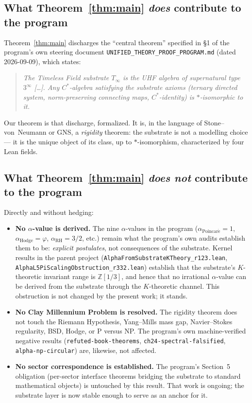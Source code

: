 \documentclass[11pt,a4paper]{article}
\theoremstyle{plain}
\theoremstyle{definition}
\begin{document}
\subsection*{What Theorem~\ref{thm:main} \emph{does} contribute to the program}

Theorem~\ref{thm:main} discharges the ``central theorem'' specified in \S 1 of the program's own steering document \texttt{UNIFIED\_THEORY\_PROOF\_PROGRAM.md} (dated 2026-09-09), which states:

\begin{quote}\itshape
The Timeless Field substrate $T_{\infty}$ is the UHF algebra of supernatural type $3^{\infty}$ [\ldots]. Any $C^{\ast}$-algebra satisfying the substrate axioms (ternary directed system, norm-preserving connecting maps, $C^{\ast}$-identity) is $\ast$-isomorphic to it.
\end{quote}

Our theorem is that discharge, formalized. It is, in the language of Stone--von~Neumann or GNS, a \emph{rigidity} theorem: the substrate is not a modelling choice --- it is the unique object of its class, up to $\ast$-isomorphism, characterized by four Lean fields.

\subsection*{What Theorem~\ref{thm:main} \emph{does not} contribute to the program}

Directly and without hedging:

\begin{itemize}[leftmargin=*]
  \item \textbf{No $\alpha$-value is derived.} The nine $\alpha$-values in the program ($\alpha_{\mathrm{Poincar\acute{e}}} = 1$, $\alpha_{\mathrm{Hodge}} = \varphi$, $\alpha_{\mathrm{RH}} = 3/2$, etc.) remain what the program's own audits establish them to be: \emph{explicit postulates}, not consequences of the substrate. Kernel results in the parent project (\texttt{AlphaFromSubstrateKTheory\_r123.lean}, \texttt{AlphaL5PiScalingObstruction\_r332.lean}) establish that the substrate's $K$-theoretic invariant range is $\mathbb{Z}[1/3]$, and hence that no irrational $\alpha$-value can be derived from the substrate through the $K$-theoretic channel. This obstruction is not changed by the present work; it stands.
  \item \textbf{No Clay Millennium Problem is resolved.} The rigidity theorem does not touch the Riemann Hypothesis, Yang--Mills mass gap, Navier--Stokes regularity, BSD, Hodge, or P versus NP. The program's own machine-verified negative results (\texttt{refuted-book-theorems}, \texttt{ch24-spectral-falsified}, \texttt{alpha-np-circular}) are, likewise, not affected.
  \item \textbf{No sector correspondence is established.} The program's Section~5 obligation (per-sector interface theorems bridging the substrate to standard mathematical objects) is untouched by this result. That work is ongoing; the substrate layer is now stable enough to serve as an anchor for it.
\end{itemize}
\end{document}
